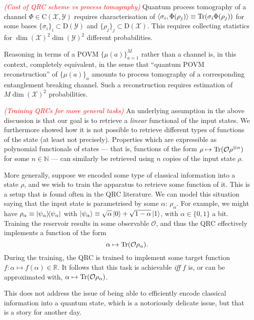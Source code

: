 \documentclass[12pt]{report}
\newcommand{\NN}{\mathbb{N}}
\newcommand{\RR}{\mathbb{R}}
\newcommand{\calY}{{\mathcal{Y}}}
\newcommand{\calO}{{\mathcal{O}}}
\newcommand{\calX}{{\mathcal{X}}}
\newcommand{\rmC}{{\mathrm{C}}}
\newcommand{\rmD}{{\mathrm{D}}}
\begin{document}
\textcolor{red}{\emph{(Cost of QRC scheme vs process tomography)}}
Quantum process tomography of a channel $\Phi\in\rmC(\calX,\calY)$ requires characterisation of $\langle\sigma_i,\Phi(\rho_j)\rangle\equiv\Tr(\sigma_i\Phi(\rho_j))$ for some bases $\{\sigma_i\}_i\subset\rmD(\calY)$ and $\{\rho_j\}_j\subset\rmD(\calX)$.
This requires collecting statistics for $\dim(\calX)^2\dim(\calY)^2$ different probabilities.

Reasoning in terms of a POVM $\{\mu(a)\}_{a=1}^M$ rather than a channel is, in this context, completely equivalent, in the sense that ``quantum POVM reconstruction'' of $\{\mu(a)\}_a$ amounts to process tomography of a corresponding entanglement breaking channel.
Such a reconstruction requires estimation of $M\dim(\calX)^2$ probabilities.

\textcolor{red}{\emph{(Training QRCs for more general tasks)}}
An underlying assumption in the above discussion is that our goal is to retrieve a \emph{linear} functional of the input states.
We furthermore showed how it is not possible to retrieve different types of functions of the state (at least not precisely).
Properties which are expressible as polynomial functionals of states --- that is, functions of the form $\rho\mapsto \Tr(\calO\rho^{\otimes n})$ for some $n\in\NN$ --- can similarly be retrieved using $n$ copies of the input state $\rho$.

More generally, suppose we encoded some type of classical information into a state $\rho$, and we wish to train the apparatus to retrieve some function of it. This is a setup that is found often in the QRC literature.
We can model this situation saying that the input state is parametrised by some $\alpha$: $\rho_\alpha$.
For example, we might have $\rho_\alpha\equiv\ketbra{\psi_\alpha}{\psi_\alpha}$ with $\ket{\psi_\alpha}\equiv \sqrt{\alpha}\ket0+\sqrt{1-\alpha}\ket1$, with $\alpha\in\{0,1\}$ a bit.
Training the reservoir results in some observable $\calO$, and thus the QRC effectively implements a function of the form
\begin{equation}
	\alpha\mapsto \Tr(\calO\rho_\alpha).
\end{equation}
During the training, the QRC is trained to implement some target function $f:\alpha\mapsto f(\alpha)\in\RR$.
It follows that this task is achievable \emph{iff} $f$ is, or can be approximated with, $\alpha\mapsto \Tr(\calO\rho_\alpha)$.

This does not address the issue of being able to efficiently encode classical information into a quantum state, which is a notoriously delicate issue, but that is a story for another day.
\end{document}
